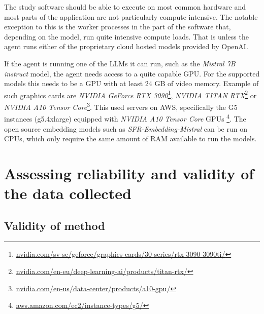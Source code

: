 The study software should be able to execute on most common hardware and most parts of the application are not particularly compute intensive. The notable exception to this is the worker processes in the  part of the software that, depending on the model, run quite intensive compute loads. That is unless the agent runs either of the proprietary cloud hosted models provided by OpenAI.


If the agent is running one of the \gls{LLM}s it can run, such as the \textit{Mistral 7B instruct} model, the agent needs access to a quite capable GPU. For the supported models this needs to be a GPU with at least 24 GB of video memory. Example of such graphics cards are \textit{NVIDIA GeForce RTX 3090}\footnote{\href{https://www.nvidia.com/sv-se/geforce/graphics-cards/30-series/rtx-3090-3090ti/}{nvidia.com/sv-se/geforce/graphics-cards/30-series/rtx-3090-3090ti/}}, \textit{NVIDIA TITAN RTX}\footnote{\href{https://www.nvidia.com/en-eu/deep-learning-ai/products/titan-rtx/}{nvidia.com/en-eu/deep-learning-ai/products/titan-rtx/}} or \textit{NVIDIA A10 Tensor Core}\footnote{\href{https://www.nvidia.com/en-us/data-center/products/a10-gpu/}{nvidia.com/en-us/data-center/products/a10-gpu/}}. This used servers on AWS, specifically the G5 instances (g5.4xlarge) equipped with \textit{NVIDIA A10 Tensor Core} GPUs \footnote{\href{https://aws.amazon.com/ec2/instance-types/g5/}{aws.amazon.com/ec2/instance-types/g5/}}. The open source embedding models such as \textit{SFR-Embedding-Mistral} can be run on CPUs, which only require the same amount of RAM available to run the models.


\section{Assessing reliability and validity of the data collected}
\label{sec:assessingReliability}






\subsection{Validity of method}
\label{sec:validtyOfMethod}




